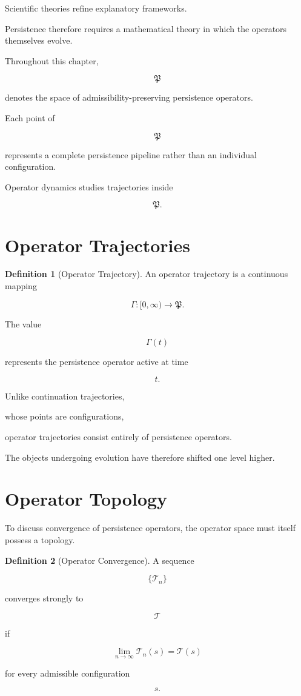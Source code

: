 \documentclass[11pt]{book}
\numberwithin{equation}{chapter}
\theoremstyle{definition}
\newtheorem{definition}{Definition}[chapter]
\theoremstyle{plain}
\begin{document}
Scientific theories refine explanatory frameworks.

Persistence therefore requires a mathematical theory in which the
operators themselves evolve.

Throughout this chapter,

\[
\mathfrak P
\]

denotes the space of admissibility-preserving persistence operators.

Each point of

\[
\mathfrak P
\]

represents a complete persistence pipeline rather than an individual
configuration.

Operator dynamics studies trajectories inside

\[
\mathfrak P.
\]

\section{Operator Trajectories}

\begin{definition}[Operator Trajectory]

An operator trajectory is a continuous mapping

\[
\Gamma :
[0,\infty)
\rightarrow
\mathfrak P.
\]

The value

\[
\Gamma(t)
\]

represents the persistence operator active at time

\[
t.
\]

\end{definition}

Unlike continuation trajectories,

whose points are configurations,

operator trajectories consist entirely of persistence operators.

The objects undergoing evolution have therefore shifted one level
higher.

\section{Operator Topology}

To discuss convergence of persistence operators, the operator space
must itself possess a topology.

\begin{definition}[Operator Convergence]

A sequence

\[
\{\mathcal T_n\}
\]

converges strongly to

\[
\mathcal T
\]

if

\[
\lim_{n\to\infty}
\mathcal T_n(s)
=
\mathcal T(s)
\]

for every admissible configuration

\[
s.
\]

\end{definition}
\end{document}
